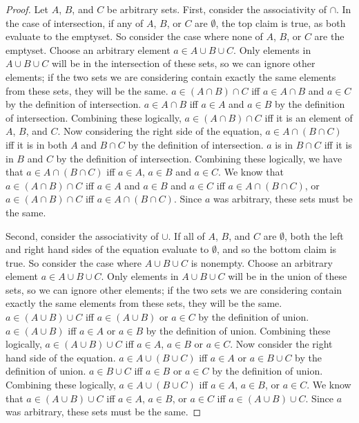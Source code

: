 \begin{proof}
    Let $A$, $B$, and $C$ be arbitrary sets. First, consider the associativity
    of $\cap$. In the case of intersection, if any of $A$, $B$, or $C$ are
    $\emptyset$, the top claim is true, as both evaluate to the emptyset. So
    consider the case where none of $A$, $B$, or $C$ are the emptyset. Choose an
    arbitrary element $a \in A \cup B \cup C$. Only elements in $A \cup B \cup
    C$ will be in the intersection of these sets, so we can ignore other
    elements; if the two sets we are considering contain exactly the same
    elements from these sets, they will be the same. $a \in (A \cap B) \cap C$
    iff $a \in A \cap B$ and $a \in C$ by the definition of intersection. $a\in
    A \cap B$ iff $a \in A$ and $a \in B$ by the definition of intersection.
    Combining these logically, $a \in (A \cap B) \cap C$ iff it is an element of
    $A$, $B$, and $C$. Now considering the right side of the equation, $a \in A
    \cap (B \cap C)$ iff it is in both $A$ and $B \cap C$ by the definition of
    intersection. $a$ is in $B \cap C$ iff it is in $B$ and $C$ by the
    definition of intersection. Combining these logically, we have that $a \in A
    \cap (B \cap C)$ iff $a \in A$, $a \in B$ and $a \in C$. We know that $a \in
    (A \cap B) \cap C$ iff $a \in A$ and $a \in B$ and $a \in C$ iff $a \in A
    \cap (B \cap C)$, or $a \in (A \cap B) \cap C$ iff $a \in A \cap (B \cap
    C)$. Since $a$ was arbitrary, these sets must be the same.

    Second, consider the associativity of $\cup$. If all of $A$, $B$, and $C$
    are $\emptyset$, both the left and right hand sides of the equation evaluate
    to $\emptyset$, and so the bottom claim is true. So consider the case where
    $A \cup B \cup C$ is nonempty. Choose an arbitrary element $a \in A \cup B
    \cup C$. Only elements in $A \cup B \cup C$ will be in the union of these
    sets, so we can ignore other elements; if the two sets we are considering
    contain exactly the same elements from these sets, they will be the same. $a
    \in (A \cup B) \cup C$ iff $a \in (A \cup B)$ or $a \in C$ by the definition
    of union. $a \in (A \cup B)$ iff $a \in A$ or $a \in B$ by the definition of
    union. Combining these logically, $a \in (A \cup B) \cup C$ iff $a \in A$,
    $a \in B$ or $a \in C$. Now consider the right hand side of the equation. $a
    \in A \cup (B \cup C)$ iff $a \in A$ or $a \in B \cup C$ by the definition
    of union.  $a \in B \cup C$ iff $a \in B$ or $a \in C$ by the definition of
    union. Combining these logically, $a \in A \cup (B \cup C)$ iff $a \in A$,
    $a \in B$, or $a \in C$. We know that $a \in (A \cup B) \cup C$ iff $a \in
    A$, $a \in B$, or $a \in C$ iff $a \in (A \cup B) \cup C$. Since $a$ was
    arbitrary, these sets must be the same.
\end{proof}

